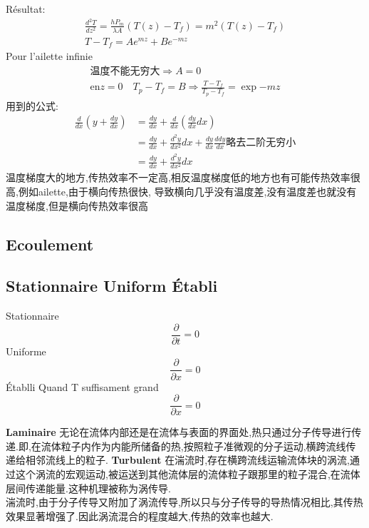 R\'esultat:
\begin{equation}
	\begin{split}
	\frac{ d^2T}{dz^2}=\frac{ hP_m}{\lambda A}(T(z)-T_f)=m^2(T(z)-T_f) \\
	 T-T_f=A e^{mz} + B e^{-mz}
	\end{split}
\end{equation}
Pour l'ailette infinie
\begin{equation}
	\begin{split}
	  \text{温度不能无穷大}\Rightarrow A=0 \\
	  \text{en} z=0 \quad T_p - T_f =B \Rightarrow \frac{T-T_f}{T_p - T_f}=\exp{-mz}
	\end{split}
\end{equation}
用到的公式:
\begin{equation}
	\begin{split}
	 \frac{ d}{dx}(y+\frac{dy}{dx}) & = \frac{ dy}{dx}+\frac{ d}{dx}(\frac{ dy}{dx}dx) \\
	 & = \frac{ dy}{dx}+\frac{d^2y}{dx^2}dx + \frac{ dy}{dx}\frac{ ddy}{dx} \text{略去二阶无穷小} \\
	 & = \frac{ dy}{dx}+\frac{ d^2y}{dx^2}dx
	\end{split}
\end{equation}
温度梯度大的地方,传热效率不一定高,相反温度梯度低的地方也有可能传热效率很高,例如ailette,由于横向传热很快,
导致横向几乎没有温度差,没有温度差也就没有温度梯度,但是横向传热效率很高

\subsection{Ecoulement}
\subsection{Stationnaire Uniform \'Etabli}
Stationnaire
$$ \frac{\partial  }{\partial t}=0 $$
Uniforme
$$ \frac{\partial  }{\partial x}=0 $$
\'Etablli
Quand T suffisament grand
$$ \frac{\partial  }{\partial x}=0 $$


\textbf{Laminaire}
无论在流体内部还是在流体与表面的界面处,热只通过分子传导进行传递.即,在流体粒子内作为内能所储备的热,按照粒子准微观的分子运动,横跨流线传递给相邻流线上的粒子.
\textbf{Turbulent}
在湍流时,存在横跨流线运输流体块的涡流,通过这个涡流的宏观运动,被运送到其他流体层的流体粒子跟那里的粒子混合,在流体层间传递能量.这种机理被称为涡传导.\\
湍流时,由于分子传导又附加了涡流传导,所以只与分子传导的导热情况相比,其传热效果显著增强了.因此涡流混合的程度越大,传热的效率也越大.


